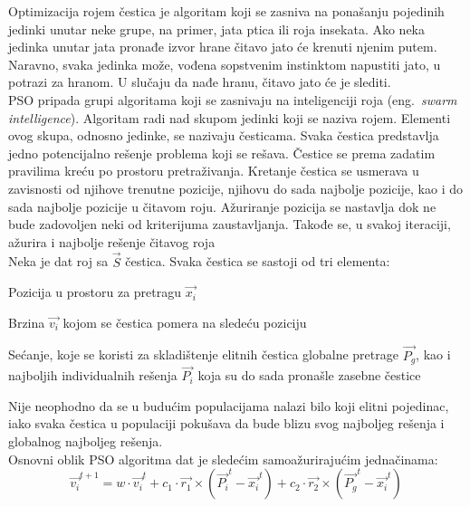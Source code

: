 \documentclass[a4paper]{article}
\begin{document}
Optimizacija rojem čestica je algoritam koji se zasniva na ponašanju pojedinih jedinki
unutar neke grupe, na primer, jata ptica ili roja insekata. Ako neka jedinka
unutar jata pronađe izvor hrane čitavo jato će krenuti njenim putem. Naravno, svaka 
jedinka može, vođena sopstvenim instinktom napustiti jato, u potrazi za hranom.
U slučaju da nađe hranu, čitavo jato će je slediti. \\

PSO pripada grupi algoritama koji se zasnivaju na inteligenciji roja
(eng.~{\em swarm intelligence}). Algoritam radi nad skupom jedinki koji se naziva rojem. 
Elementi ovog skupa, odnosno jedinke, se nazivaju česticama. 
Svaka čestica predstavlja jedno potencijalno rešenje problema koji se rešava. 
Čestice se prema zadatim pravilima kreću po prostoru pretraživanja. 
Kretanje čestica se usmerava u zavisnosti od njihove trenutne pozicije, 
njihovu do sada najbolje pozicije, kao i do sada najbolje pozicije u čitavom roju. 
Ažuriranje pozicija se nastavlja dok ne bude zadovoljen neki od kriterijuma zaustavljanja.
Takođe se, u svakoj iteraciji, ažurira i najbolje rešenje čitavog roja \\


Neka je dat roj sa $\vec{S}$ čestica. Svaka čestica se sastoji od tri elementa:
\begin{list}{•}{}
	\item Pozicija u prostoru za pretragu $\vec{x_i}$
	\item Brzina $\vec{v_i}$ kojom se čestica pomera na sledeću poziciju
	\item Sećanje, koje se koristi za skladištenje elitnih čestica 
	globalne pretrage $\vec{P_g}$, kao i najboljih individualnih 
	rešenja $\vec{P_i}$ koja su do sada pronašle zasebne čestice\\
\end{list}

Nije neophodno da se u budućim populacijama nalazi bilo koji elitni pojedinac, iako svaka čestica u populaciji pokušava da bude blizu svog najboljeg rešenja i globalnog najboljeg rešenja. \\ 


Osnovni oblik PSO algoritma dat je sledećim samoažurirajućim jednačinama: \\ 
\begin{equation}\label{eq:v}
\vec{v_{i}}^{t+1} = w \cdot \vec{v_{i}}^{t} + c_1 \cdot \vec{r_1} \times (\vec{P_{i}}^{t} - \vec{x_{i}}^{t}) + c_2\cdot \vec{r_2} \times (\vec{P_{g}}^{t} - \vec{x_{i}}^{t}) 
\end{equation}
\end{document}
